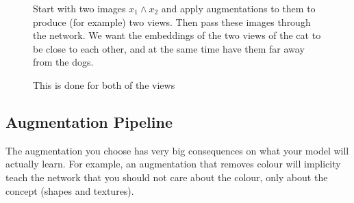 \documentclass[11pt]{article}
\begin{document}
\begin{figure}[H]
    \centering
    \caption*{Start with two images $x_1 \wedge x_2$ and apply augmentations to them to produce (for example) two views. Then pass these images through the network. We want the embeddings of the two views of the cat to be close to each other, and at the same time have them far away from the dogs.}
\end{figure}

\begin{figure}[H]
    \centering
    \caption*{This is done for both of the views}
\end{figure}

\subsection{Augmentation Pipeline}

The augmentation you choose has very big consequences on what your model will actually learn. For example, an augmentation that removes colour will implicity teach the network that you should not care about the colour, only about the concept (shapes and textures).
\end{document}
